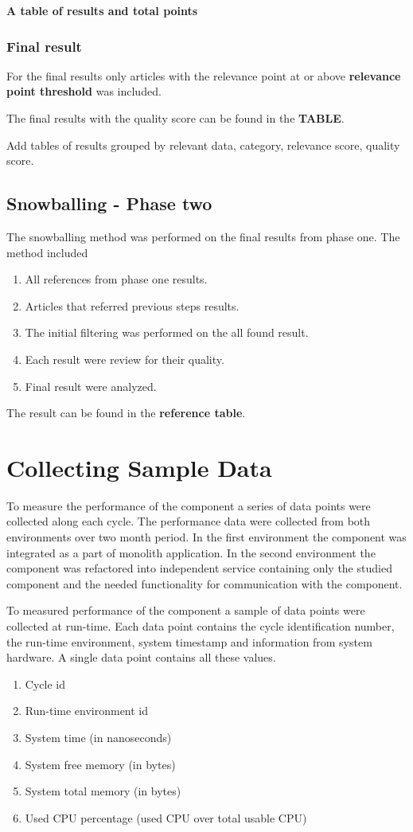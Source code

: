 \textbf{A table of results and total points}

\subsubsection{Final result}
For the final results only articles with the relevance point at or above \textbf{relevance point threshold} was included.

The final results with the quality score can be found in the \textbf{TABLE}.

Add tables of results grouped by relevant data, category, relevance score, quality score.

\subsection{Snowballing - Phase two}
The snowballing method was performed on the final results from phase one.
The method included 
\begin{enumerate}
    \item All references from phase one results.
    \item Articles that referred previous steps results.
    \item The initial filtering was performed on the all found result.
    \item Each result were review for their quality.
    \item Final result were analyzed. 
\end{enumerate}

The result can be found in the \textbf{reference table}.

\section{Collecting Sample Data}
To measure the performance of the component a series of data points were collected along each cycle.
The performance data were collected from both environments over two month period.
In the first environment the component was integrated as a part of monolith application.
In the second environment the component was refactored into independent service containing only the studied component and the needed functionality for communication with the component.

To measured performance of the component a sample of data points were collected at run-time.
Each data point contains the cycle identification number, the run-time environment, system timestamp and information from system hardware.
A single data point contains all these values.
\begin{enumerate}
    \item Cycle id
    \item Run-time environment id
    \item System time (in nanoseconds)
    \item System free memory (in bytes)
    \item System total memory (in bytes)
    \item Used CPU percentage (used CPU over total usable CPU)
\end{enumerate}


